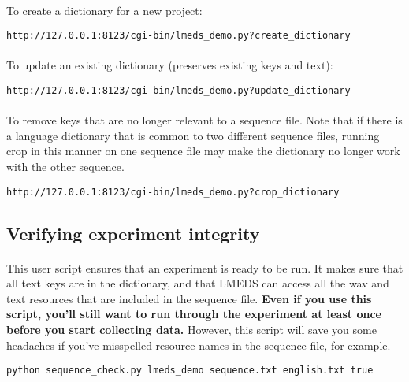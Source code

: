\paragraph{}
To create a dictionary for a new project:
\begin{lstlisting}
http://127.0.0.1:8123/cgi-bin/lmeds_demo.py?create_dictionary
\end{lstlisting}

\paragraph{}
To update an existing dictionary (preserves existing keys and text):
\begin{lstlisting}
http://127.0.0.1:8123/cgi-bin/lmeds_demo.py?update_dictionary
\end{lstlisting}

\paragraph{}
To remove keys that are no longer relevant to a sequence file.  Note that if there is a language dictionary
that is common to two different sequence files, running crop in this manner on one sequence file may
make the dictionary no longer work with the other sequence.
\begin{lstlisting}
http://127.0.0.1:8123/cgi-bin/lmeds_demo.py?crop_dictionary
\end{lstlisting}


\subsection{Verifying experiment integrity}

\paragraph{}
This user script ensures that an experiment is ready to be run.  It makes sure that all text keys are in the dictionary, and that LMEDS can access all the wav and text resources that are included in the sequence file.  \textbf{Even if you use this script, you'll still want to run through the experiment at least once before you start collecting data.}  However, this script will save you some headaches if you've misspelled resource names in the sequence file, for example.

\begin{lstlisting}
python sequence_check.py lmeds_demo sequence.txt english.txt true
\end{lstlisting}

